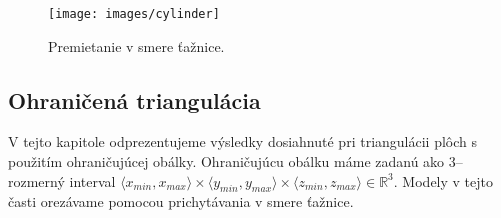 \begin{figure}
    \centerline{\texttt{[image: images/cylinder]}}
    \caption[Ohraničená triangulácia tetrahedronu -- premietanie v smere ťažnice]
    {Premietanie v smere ťažnice.}
    \label{obr:cylinder}
\end{figure}


\subsection{Ohraničená triangulácia}

V tejto kapitole odprezentujeme výsledky dosiahnuté pri triangulácii plôch s použitím 
ohraničujúcej obálky. Ohraničujúcu obálku máme zadanú ako $3$--rozmerný interval 
$\langle x_{min}, x_{max}\rangle
\times \langle y_{min}, y_{max}\rangle \times \langle z_{min}, z_{max}\rangle \in \mathbb{R}^3.$ 
Modely v tejto časti orezávame pomocou prichytávania v smere ťažnice.

